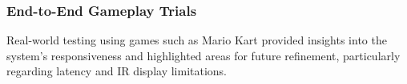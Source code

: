 \subsubsection{End-to-End Gameplay Trials}
Real-world testing using games such as Mario Kart provided insights into the system’s responsiveness and highlighted areas for future refinement, particularly regarding latency and IR display limitations.

%
%
%
%
%

%
